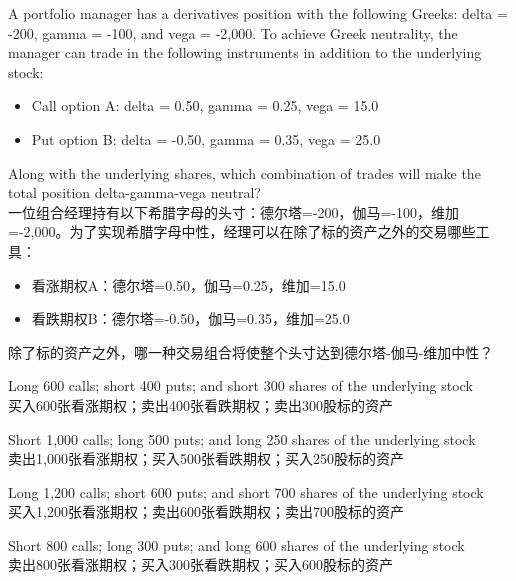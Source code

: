\documentclass{article}
\newcounter{question} %
\begin{document}
        \begin{question}
            A portfolio manager has a derivatives position with the following Greeks: delta = -200, gamma = -100, and vega = -2,000. To achieve Greek neutrality, the manager can trade in the following instruments in addition to the underlying stock:
            \begin{itemize}
                \item Call option A: delta = 0.50, gamma = 0.25, vega = 15.0
                \item Put option B: delta = -0.50, gamma = 0.35, vega = 25.0
            \end{itemize}
            Along with the underlying shares, which combination of trades will make the total position delta-gamma-vega neutral?
            \\一位组合经理持有以下希腊字母的头寸：德尔塔=-200，伽马=-100，维加=-2,000。为了实现希腊字母中性，经理可以在除了标的资产之外的交易哪些工具：
            \begin{itemize}
                \item 看涨期权A：德尔塔=0.50，伽马=0.25，维加=15.0
                \item 看跌期权B：德尔塔=-0.50，伽马=0.35，维加=25.0
            \end{itemize}
            除了标的资产之外，哪一种交易组合将使整个头寸达到德尔塔-伽马-维加中性？
            \end{question}
            
            \begin{choices}
            \item Long 600 calls; short 400 puts; and short 300 shares of the underlying stock\\
            买入600张看涨期权；卖出400张看跌期权；卖出300股标的资产
            \item Short 1,000 calls; long 500 puts; and long 250 shares of the underlying stock\\
            卖出1,000张看涨期权；买入500张看跌期权；买入250股标的资产
            \item Long 1,200 calls; short 600 puts; and short 700 shares of the underlying stock\\
            买入1,200张看涨期权；卖出600张看跌期权；卖出700股标的资产
            \item Short 800 calls; long 300 puts; and long 600 shares of the underlying stock\\
            卖出800张看涨期权；买入300张看跌期权；买入600股标的资产
            \end{choices}
            
\end{document}
